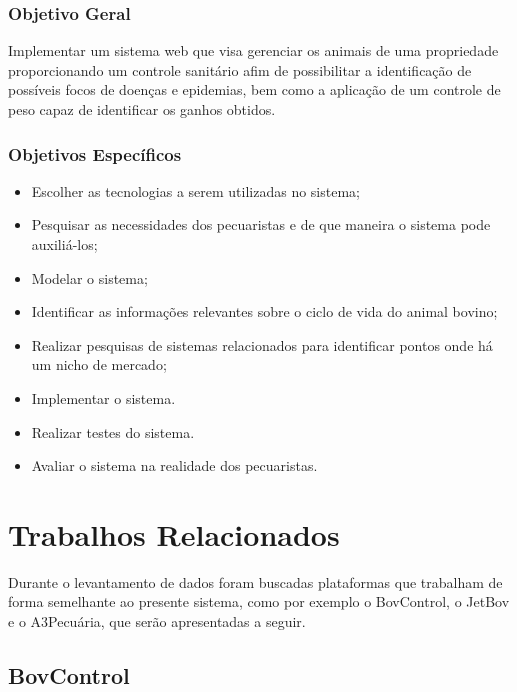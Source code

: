 \documentclass[12pt]{article}
\begin{document}
\begin{titlepage}
\begin{center}
\subsubsection{Objetivo Geral}

Implementar um sistema web que visa gerenciar os animais de uma propriedade proporcionando um controle sanitário afim de possibilitar a identificação de possíveis focos de doenças e epidemias, bem como a aplicação de um controle de peso capaz de identificar os ganhos obtidos.

\subsubsection{Objetivos Específicos}

\begin{itemize}
	\item Escolher as tecnologias a serem utilizadas no sistema;
	\item Pesquisar as necessidades dos pecuaristas e de que maneira o sistema pode auxiliá-los;
	\item Modelar o sistema;
	\item Identificar as informações relevantes sobre o ciclo de vida do animal bovino;
	\item Realizar pesquisas de sistemas relacionados para identificar pontos onde há um nicho de mercado;
	\item Implementar o sistema.
	\item Realizar testes do sistema.
	\item Avaliar o sistema na realidade dos pecuaristas.
\end{itemize}

\section{Trabalhos Relacionados}


Durante o levantamento de dados foram buscadas plataformas que trabalham de forma semelhante ao presente sistema, como por exemplo o BovControl, o JetBov e o A3Pecuária, que serão apresentadas a seguir.

\subsection{BovControl}


\end{center}
\end{titlepage}
\end{document}
